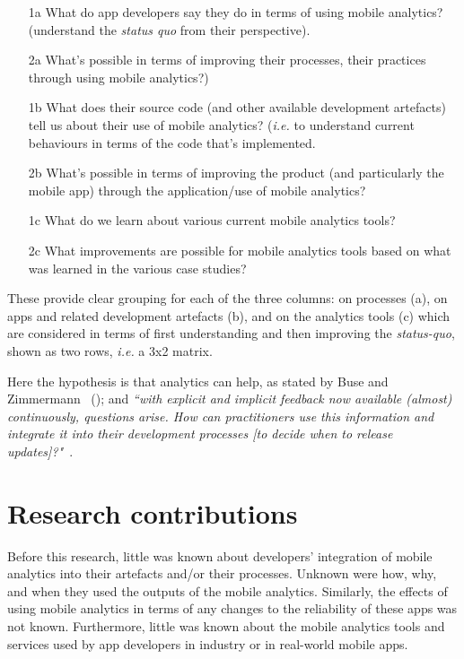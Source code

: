 \begin{enumerate}
    \item [1a] What do app developers say they do in terms of using mobile analytics? (understand the \emph{status quo} from their perspective).
    \item [2a] What's possible in terms of improving their processes, their practices through using mobile analytics?)
    \item [1b] What does their source code (and other available development artefacts) tell us about their use of mobile analytics? (\emph{i.e.} to understand current behaviours in terms of the code that's implemented.
    \item [2b] What's possible in terms of improving the product (and particularly the mobile app) through the application/use of mobile analytics?
    \item [1c] What do we learn about various current mobile analytics tools?
    \item [2c] What improvements are possible for mobile analytics tools based on what was learned in the various case studies?
\end{enumerate}

These provide clear grouping for each of the three columns: on processes (a), on apps and related development artefacts (b), and on the analytics tools (c) which are considered in terms of first understanding and then improving the \emph{status-quo}, shown as two rows, \emph{i.e.} a 3x2 matrix. 


Here the hypothesis is that analytics can help, as stated by Buse and Zimmermann ~(\citeyear{buse_analytics_2010}); and \emph{``with explicit and implicit feedback now available (almost) continuously, questions arise. How can practitioners use this information and integrate it into their development processes [to decide when to release updates]?"}~.


\section{Research contributions}
Before this research, little was known about developers' integration of mobile analytics into their artefacts and/or their processes. Unknown were how, why, and when they used the outputs of the mobile analytics. Similarly, the effects of using mobile analytics in terms of any changes to the reliability of these apps was not known. Furthermore, little was known about the mobile analytics tools and services used by app developers in industry or in real-world mobile apps.


